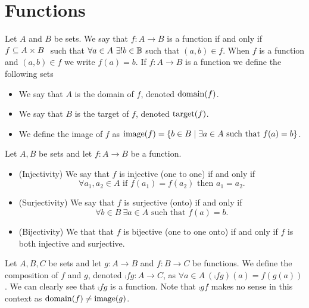     \section{Functions}
        \begin{definition}
            Let $A$ and $B$ be sets. We say that $f : A \rightarrow B$ is a function if 
            and only if $f \subseteq A \times B \ $ such that
            $\forall a \in A \ \exists ! b \in \mathbb{B}$ such that $(a, b) \in f$.
            When $f$ is a function and $(a, b) \in f$ we write $f(a) = b$. If
            $f: A \rightarrow B$ is a function we define the following sets
            \begin{itemize}
                \item
                    We say that $A$ is the domain of $f$, denoted $\mathrm{domain}(f)$.
                \item
                    We say that $B$ is the target of $f$, denoted $\mathrm{target}(f)$.
                \item
                    We define the image of $f$ as 
                    $\mathrm{image}(f) = \left\{b \in B \mid \exists a \in A \mbox{ such that } f(a) = b\right\}$.
            \end{itemize}
        \end{definition}
        \begin{definition}
            Let $A, B$ be sets and let $f : A \rightarrow B$ be a function.
            \begin{itemize}
                \item
                    (Injectivity) We say that $f$ is injective (one to one) if and only if
                    \[
                        \forall a_1, a_2 \in A \mbox{ if } f(a_1) = f(a_2) \mbox{ then } a_1 = a_2.
                    \]
                \item
                    (Surjectivity) We say that $f$ is surjective (onto) if and only if
                    \[
                        \forall b \in B \ \exists a \in A \mbox{ such that } f(a) = b.
                    \]
                \item
                    (Bijectivity) We that that $f$ is bijective (one to one onto)
                    if and only if $f$ is both injective and surjective.
            \end{itemize}
        \end{definition}
        \begin{definition}
            Let $A, B, C$ be sets and let $g: A \rightarrow B$ and $f: B \rightarrow C$
            be functions. We define the composition of $f$ and $g$, denoted
            $\comp{f}{g}: A \rightarrow C$, as $\forall a \in A \ (\comp{f}{g})(a) = f(g(a))$.
            We can clearly see that $\comp{f}{g}$ is a function. Note that $\comp{g}{f}$
            makes no sense in this context as $\mathrm{domain}(f) \neq \mathrm{image}(g)$.
        \end{definition}

